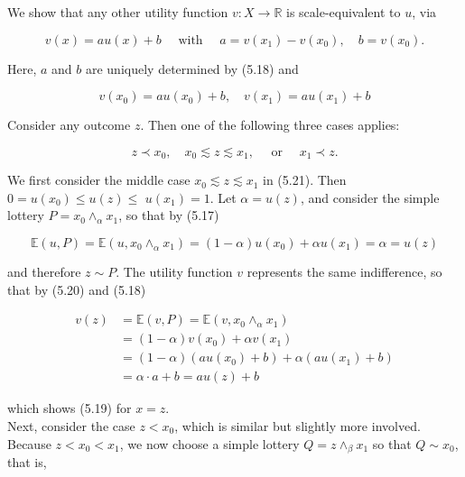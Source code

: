 \documentclass[12pt]{article}
\begin{document}
We show that any other utility function $v: X \rightarrow \mathbb{R}$ is scale-equivalent to $u$, via


\begin{equation*}
v(x)=a u(x)+b \quad \text { with } \quad a=v\left(x_{1}\right)-v\left(x_{0}\right), \quad b=v\left(x_{0}\right) . \tag{5.19}
\end{equation*}


Here, $a$ and $b$ are uniquely determined by (5.18) and


\begin{equation*}
v\left(x_{0}\right)=a u\left(x_{0}\right)+b, \quad v\left(x_{1}\right)=a u\left(x_{1}\right)+b \tag{5.20}
\end{equation*}


Consider any outcome $z$. Then one of the following three cases applies:


\begin{equation*}
z \prec x_{0}, \quad x_{0} \lesssim z \lesssim x_{1}, \quad \text { or } \quad x_{1} \prec z . \tag{5.21}
\end{equation*}


We first consider the middle case $x_{0} \lesssim z \lesssim x_{1}$ in (5.21). Then $0=u\left(x_{0}\right) \leq u(z) \leq$ $u\left(x_{1}\right)=1$. Let $\alpha=u(z)$, and consider the simple lottery $P=x_{0} \wedge_{\alpha} x_{1}$, so that by (5.17)

$$
\mathbb{E}(u, P)=\mathbb{E}\left(u, x_{0} \wedge_{\alpha} x_{1}\right)=(1-\alpha) u\left(x_{0}\right)+\alpha u\left(x_{1}\right)=\alpha=u(z)
$$

and therefore $z \sim P$. The utility function $v$ represents the same indifference, so that by (5.20) and (5.18)

$$
\begin{aligned}
v(z) & =\mathbb{E}(v, P)=\mathbb{E}\left(v, x_{0} \wedge_{\alpha} x_{1}\right) \\
& =(1-\alpha) v\left(x_{0}\right)+\alpha v\left(x_{1}\right) \\
& =(1-\alpha)\left(a u\left(x_{0}\right)+b\right)+\alpha\left(a u\left(x_{1}\right)+b\right) \\
& =\alpha \cdot a+b=a u(z)+b
\end{aligned}
$$

which shows (5.19) for $x=z$.\\
Next, consider the case $z<x_{0}$, which is similar but slightly more involved. Because $z<x_{0}<x_{1}$, we now choose a simple lottery $Q=z \wedge_{\beta} x_{1}$ so that $Q \sim x_{0}$, that is,
\end{document}
